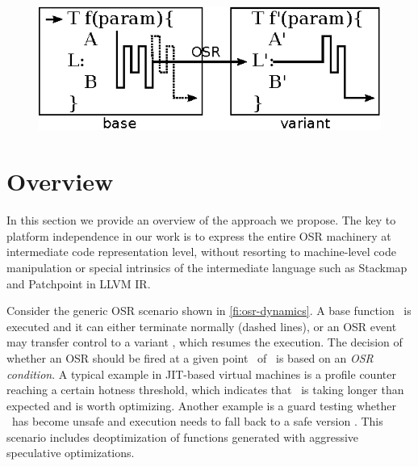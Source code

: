 
\ifdefined\noauthorea
\begin{figure}[t]
\begin{center}
\includegraphics[width=0.6\columnwidth]{figures/overview-osr/overview-osr.eps}
\caption{\protect}
\end{center}
\end{figure}
\fi

\section{Overview}
\label{se:overview}

In this section we provide an overview of the approach we propose. The key to platform independence in our work is to express the entire OSR machinery at intermediate code representation level, without resorting to machine-level code manipulation or special intrinsics of the intermediate language such as Stackmap and Patchpoint in LLVM IR. %


Consider the generic OSR scenario shown in \myfigure\ref{fi:osr-dynamics}. A base function \fbase\ is executed and it can either terminate normally (dashed lines), or an OSR event may transfer control to a variant \fvariant, which resumes the execution. The decision of whether an OSR should be fired at a given point \osrpoint\ of \fbase\ is based on an {\em OSR condition}. A typical example in JIT-based virtual machines is a profile counter reaching a certain hotness threshold, which indicates that \fbase\ is taking longer than expected and is worth optimizing. Another example is a guard testing whether \fbase\ has become unsafe and execution needs to fall back to a safe version \fvariant. This scenario includes deoptimization of functions generated with aggressive speculative optimizations. 


